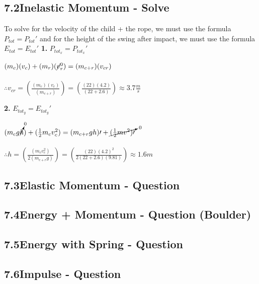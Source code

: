 \documentclass{article}
\begin{document}
\begin{adjustwidth}{1cm}{0pt}
    \subsection*{7.2\hspace*{0.5cm}Inelastic Momentum - Solve}
    To solve for the velocity of the child + the rope, we must use the formula $P_{tot} = P_{tot}\prime$ and for the height of the swing after impact, we must use the formula $E_{tot} = E_{tot}\prime$\newline\newline
    \textbf{1.} $P_{tot_{x}} = P_{tot_{x}}\prime$ \\
    \begin{adjustwidth}{0.6cm}{0pt}
        $(m_{c})({v}_{c}) + (m_{r})(\cancel{v}_{r}^0) = (m_{c + r})(v_{cr})$ \\\\
        $\therefore v_{cr} = \left(\frac{(m_{c})(v_{c})}{(m_{c + r})}\right) = \left(\frac{(22)(4.2)}{(22 + 2.6)}\right) \approx 3.7\frac{m}{s}$
    \end{adjustwidth}\vspace*{15pt}
    \textbf{2.} $E_{tot_{y}} = E_{tot_{y}}\prime$ \\
    \begin{adjustwidth}{0.6cm}{0pt}
        $(m_{c}g\cancelto{0}{h}) + (\frac{1}{2}m_{c}v_{c}^2) = (m_{c + r}gh)\prime + \cancelto{0}{(\frac{1}{2}mv^2)\prime}$ \\\\
        $\therefore h = \left(\frac{(m_{c}v_{c}^2)}{2(m_{c+r}g)}\right) = \left(\frac{(22){(4.2)}^2}{2(22 + 2.6)(9.81)}\right) \approx 1.6m$
    \end{adjustwidth}\vspace*{15pt}

    \subsection*{7.3\hspace*{0.5cm}Elastic Momentum - Question}


    \subsection*{7.4\hspace*{0.5cm}Energy + Momentum - Question (Boulder)}


    \subsection*{7.5\hspace*{0.5cm}Energy with Spring - Question}


    \subsection*{7.6\hspace*{0.5cm}Impulse - Question}



\end{adjustwidth}


\end{document}
